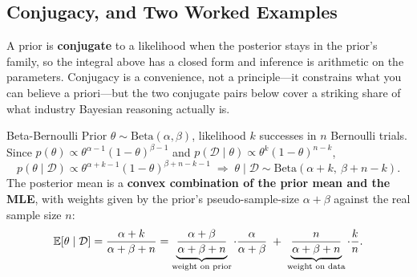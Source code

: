 \subsection{Conjugacy, and Two Worked Examples}

A prior is \textbf{conjugate} to a likelihood when the posterior stays in the prior's family, so the integral above has a closed form and inference is arithmetic on the parameters. Conjugacy is a convenience, not a principle---it constrains what you can believe a priori---but the two conjugate pairs below cover a striking share of what industry Bayesian reasoning actually is.

\begin{mathresult}{Beta-Bernoulli}
Prior $\theta \sim \text{Beta}(\alpha,\beta)$, likelihood $k$ successes in $n$ Bernoulli trials. Since $p(\theta) \propto \theta^{\alpha-1}(1-\theta)^{\beta-1}$ and $p(\mathcal{D}\mid\theta) \propto \theta^{k}(1-\theta)^{n-k}$,
\begin{equation}
p(\theta\mid\mathcal{D}) \propto \theta^{\alpha+k-1}(1-\theta)^{\beta+n-k-1} \;\Longrightarrow\; \theta \mid \mathcal{D} \sim \text{Beta}(\alpha+k,\ \beta+n-k).
\end{equation}
The posterior mean is a \textbf{convex combination of the prior mean and the MLE}, with weights given by the prior's pseudo-sample-size $\alpha+\beta$ against the real sample size $n$:
\begin{equation}
\operatorname{\mathbb{E}}[\theta \mid \mathcal{D}] = \frac{\alpha+k}{\alpha+\beta+n} = \underbrace{\frac{\alpha+\beta}{\alpha+\beta+n}}_{\text{weight on prior}}\cdot\frac{\alpha}{\alpha+\beta} \;+\; \underbrace{\frac{n}{\alpha+\beta+n}}_{\text{weight on data}}\cdot\frac{k}{n}.
\end{equation}
\end{mathresult}

